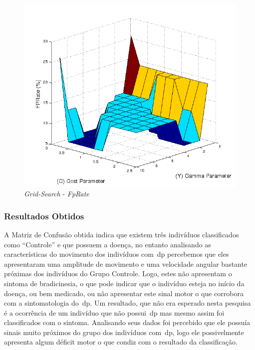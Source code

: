 \begin{figure}[!h]
 \centering
 \includegraphics[scale=0.7]{./img/gridsearchfprate.png}
\caption{\textit{Grid-Search} - \textit{FpRate}}
 \label{fig:gridfprate}
\end{figure}


\subsubsection{Resultados Obtidos}




A Matriz de Confusão obtida indica que existem três indivíduos classificados como ``Controle'' e que possuem a doença, no entanto analisando as características do movimento dos indivíduos com~\ac{dp} percebemos que eles apresentaram uma amplitude de movimento e uma velocidade angular bastante próximas dos indivíduos do Grupo Controle. Logo, estes não apresentam o sintoma de bradicinesia, o que pode indicar que o indivíduo esteja no início da doença, ou bem medicado, ou não apresentar este sinal motor o que corrobora com a sintomatologia do~\ac{dp}. 
Um resultado, que não era esperado nesta pesquisa é a ocorrência de um indivíduo que não possui~\ac{dp} mas mesmo assim foi classificados com o sintoma. Analisando seus dados foi percebido que ele possuía sinais muito próximos do grupo dos indivíduos com~\ac{dp}, logo ele possivelmente apresenta algum déficit motor o que condiz com o resultado da classificação.


